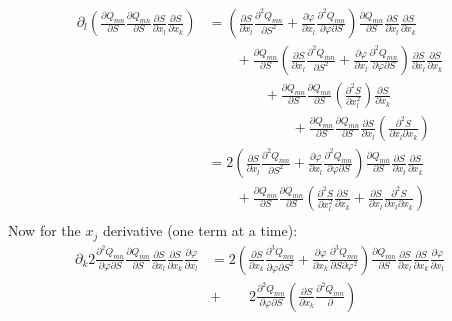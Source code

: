 \documentclass[leqno]{article}
\begin{document}
	\begin{align*}
		\partial_l \left( \frac{\partial Q_{mn}}{\partial S} \frac{\partial Q_{mn}}{\partial S} \frac{\partial S}{\partial x_l} \frac{\partial S}{\partial x_k} \right) 
		&= \left( \frac{\partial S}{\partial x_l} \frac{\partial^2 Q_{mn}}{\partial S^2} + \frac{\partial \varphi}{\partial x_l} \frac{\partial^2 Q_{mn}}{\partial \varphi \partial S} \right)\frac{\partial Q_{mn}}{\partial S} \frac{\partial S}{\partial x_l} \frac{\partial S}{\partial x_k} \\
		&\qquad+ \frac{\partial Q_{mn}}{\partial S} \left( \frac{\partial S}{\partial x_l} \frac{\partial^2 Q_{mn}}{\partial S^2} + \frac{\partial \varphi}{\partial x_l} \frac{\partial^2 Q_{mn}}{\partial \varphi \partial S} \right)\frac{\partial S}{\partial x_l} \frac{\partial S}{\partial x_k} \\
		&\qquad\qquad+ \frac{\partial Q_{mn}}{\partial S} \frac{\partial Q_{mn}}{\partial S} \left( \frac{\partial^2 S}{\partial x_l^2} \right) \frac{\partial S}{\partial x_k} \\
		&\qquad\qquad\qquad+ \frac{\partial Q_{mn}}{\partial S} \frac{\partial Q_{mn}}{\partial S} \frac{\partial S}{\partial x_l} \left( \frac{\partial^2 S}{\partial x_l \partial x_k} \right) \\
		&= 2\left( \frac{\partial S}{\partial x_l} \frac{\partial^2 Q_{mn}}{\partial S^2} + \frac{\partial \varphi}{\partial x_l} \frac{\partial^2 Q_{mn}}{\partial \varphi \partial S} \right)\frac{\partial Q_{mn}}{\partial S} \frac{\partial S}{\partial x_l} \frac{\partial S}{\partial x_k} \\
		&\qquad+ \frac{\partial Q_{mn}}{\partial S} \frac{\partial Q_{mn}}{\partial S} \left( \frac{\partial^2 S}{\partial x_l^2} \frac{\partial S}{\partial x_k} + \frac{\partial S}{\partial x_l} \frac{\partial^2 S}{\partial x_l \partial x_k} \right) \\
	\end{align*}
	Now for the $x_j$ derivative (one term at a time):
	\begin{align*}
		\partial_k 2 \frac{\partial^2 Q_{mn}}{\partial \varphi \partial S} \frac{\partial Q_{mn}}{\partial S} \frac{\partial S}{\partial x_l} \frac{\partial S}{\partial x_k} \frac{\partial \varphi}{\partial x_l} 
		&= 2 \left( \frac{\partial S}{\partial x_k} \frac{\partial^3 Q_{mn}}{\partial \varphi \partial S^2} + \frac{\partial \varphi}{\partial x_k} \frac{\partial^3 Q_{mn}}{\partial S \partial \varphi^2} \right) \frac{\partial Q_{mn}}{\partial S} \frac{\partial S}{\partial x_l} \frac{\partial S}{\partial x_k} \frac{\partial \varphi}{\partial x_l} \\
		&+\qquad 2 \frac{\partial^2 Q_{mn}}{\partial \varphi \partial S} \left( \frac{\partial S}{\partial x_k} \frac{\partial^2 Q_{mn}}{\partial } \right)
	\end{align*}
	
\end{document}

